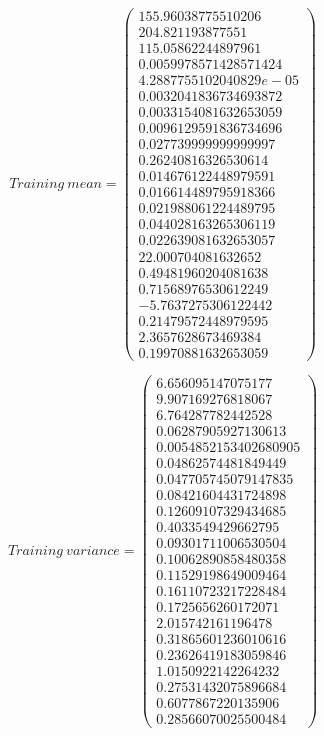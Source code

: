 \documentclass[12pt, a4paper]{article}
\begin{document}
\[Training\ mean = \left(
\begin{array}{c}
155.96038775510206\\
204.821193877551\\
115.05862244897961\\
0.0059978571428571424\\
4.2887755102040829e-05\\
0.0032041836734693872\\
0.0033154081632653059\\
0.0096129591836734696\\
0.027739999999999997\\
0.26240816326530614\\
0.014676122448979591\\
0.016614489795918366\\
0.021988061224489795\\
0.044028163265306119\\
0.022639081632653057\\
22.000704081632652\\
0.49481960204081638\\
0.71568976530612249\\
-5.7637275306122442\\
0.21479572448979595\\
2.3657628673469384\\
0.19970881632653059
\end{array} 
\right) \]

\[Training\ variance = \left(
\begin{array}{c}
6.656095147075177\\
9.907169276818067\\
6.764287782442528\\
0.06287905927130613\\
0.0054852153402680905\\
0.04862574481849449\\
0.047705745079147835\\
0.08421604431724898\\
0.12609107329434685\\
0.4033549429662795\\
0.09301711006530504\\
0.10062890858480358\\
0.11529198649009464\\
0.16110723217228484\\
0.1725656260172071\\
2.015742161196478\\
0.31865601236010616\\
0.23626419183059846\\
1.0150922142264232\\
0.27531432075896684\\
0.6077867220135906\\
0.28566070025500484
\end{array} 
\right) \]
\end{document}
